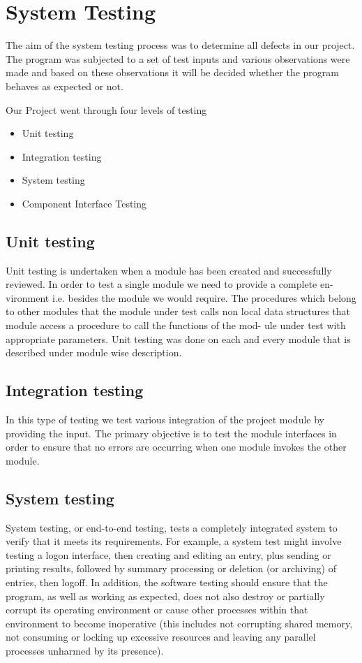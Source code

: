 \chapter{System Testing}

The aim of the system testing process was to determine all defects in our project. The program was subjected to a set of test inputs and various observations were made and based on these observations it will be decided whether the program behaves as expected or not.

Our Project went through four levels of testing
\begin{itemize}
\item Unit testing
\item Integration testing
\item System testing
\item Component Interface Testing
\end{itemize}

\section{Unit testing}
Unit testing is undertaken when a module has been created and successfully reviewed. In order to test a single module we need to provide a complete en- vironment i.e. besides the module we would require. The procedures which belong to other modules that the module under test calls non local data structures that module access a procedure to call the functions of the mod- ule under test with appropriate parameters. Unit testing was done on each and every module that is described under module wise description.

\section{Integration testing}
In this type of testing we test various integration of the project module by providing the input. The primary objective is to test the module interfaces in order to ensure that no errors are occurring when one module invokes the other module.

\section{System testing}
System testing, or end-to-end testing, tests a completely integrated system to verify that it meets its requirements. For example, a system test might involve testing a logon interface, then creating and editing an entry, plus sending or printing results, followed by summary processing or deletion (or archiving) of entries, then logoff.
In addition, the software testing should ensure that the program, as well as working as expected, does not also destroy or partially corrupt its operating environment or cause other processes within that environment to become inoperative (this includes not corrupting shared memory, not consuming or locking up excessive resources and leaving any parallel processes unharmed by its presence).

